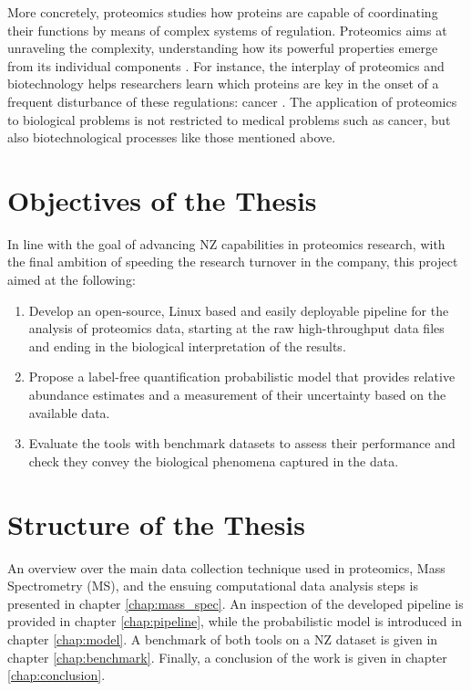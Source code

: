 More concretely, proteomics studies how proteins are capable of coordinating their functions by means of complex systems of regulation.  Proteomics aims at unraveling the complexity, understanding how its powerful properties emerge from its individual components \cite{Milo2002}. For instance, the interplay of proteomics and biotechnology helps researchers learn which proteins are key in the onset of a frequent disturbance of these regulations: cancer \cite{Saraon2012}. The application of proteomics to biological problems is not restricted to medical problems such as cancer, but also biotechnological processes like those mentioned above.





\section{Objectives of the Thesis}
\label{sec:objectives}

In line with the goal of advancing \ac{NZ} capabilities in proteomics research, with the final ambition of speeding the research turnover in the company, this project aimed at the following:

\begin{enumerate}

\item Develop an open-source, Linux based and easily deployable pipeline for the analysis of proteomics data, starting at the raw high-throughput data files and ending in the  biological interpretation of the results.

\item Propose a label-free quantification probabilistic model that provides relative abundance estimates and a measurement of their uncertainty based on the available data.


\item Evaluate the tools with benchmark datasets to assess their performance and check they convey the biological phenomena captured in the data.



\end{enumerate}

\section{Structure of the Thesis}

An overview over the main data collection technique used in proteomics, Mass Spectrometry (\ac{MS}), and the ensuing computational data analysis steps is presented in chapter \ref{chap:mass_spec}. An inspection of the developed pipeline is provided in chapter \ref{chap:pipeline}, while the probabilistic model is introduced in chapter \ref{chap:model}. A benchmark of both tools on a \ac{NZ} dataset is given in chapter \ref{chap:benchmark}. Finally, a conclusion of the work is given in chapter \ref{chap:conclusion}.